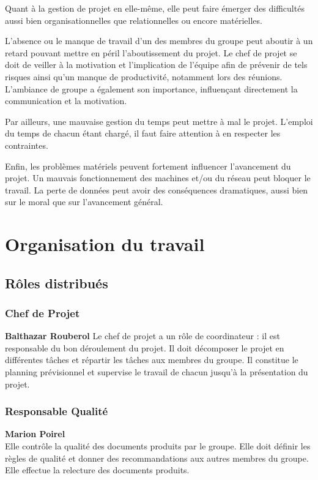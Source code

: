 Quant à la gestion de projet en elle-même, elle peut faire émerger des difficultés aussi bien organisationnelles que relationnelles ou encore matérielles.

L'absence ou le manque de travail d'un des membres du groupe peut aboutir à un retard pouvant mettre en péril l'aboutissement du projet. Le chef de projet se doit de veiller à la motivation et l'implication de l'équipe afin de prévenir de tels risques ainsi qu'un manque de productivité, notamment lors des réunions. L'ambiance de groupe a également son importance, influençant directement la communication et la motivation.

Par ailleurs, une mauvaise gestion du temps peut mettre à mal le projet. L'emploi du temps de chacun étant chargé, il faut faire attention à en respecter les contraintes.

Enfin, les problèmes matériels peuvent fortement influencer l'avancement du projet. Un mauvais fonctionnement des machines et/ou du réseau peut bloquer le travail. La perte de données peut avoir des conséquences dramatiques, aussi bien sur le moral que sur l'avancement général.

\section{Organisation du travail}
\subsection{Rôles distribués}

\subsubsection{Chef de Projet}
\textbf{Balthazar Rouberol}
Le chef de projet a un rôle de coordinateur : il est responsable du bon déroulement du projet. Il doit décomposer le projet en différentes tâches et répartir les tâches aux membres du groupe. Il constitue le planning prévisionnel et supervise le travail de chacun jusqu'à la présentation du projet.
  
\subsubsection{Responsable Qualité}
\textbf{Marion Poirel}\\
Elle contrôle la qualité des documents produits par le groupe. Elle doit définir les règles de qualité et donner des recommandations aux autres membres du groupe. Elle effectue la relecture des documents produits.

